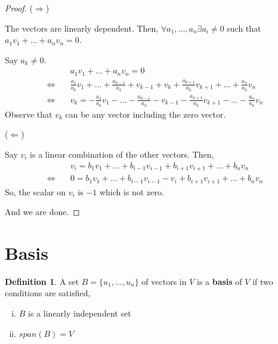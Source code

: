 \documentclass{report}
\theoremstyle{definition}
\newtheorem*{_def}{Definition}
\theoremstyle{remark}
\begin{document}
\begin{proof}
($\Rightarrow$)

The vectors are linearly dependent.
Then, $\forall a_1,...,a_n \exists a_i\neq 0$ such that $a_1v_1+...+a_nv_n=0$.

Say $a_k\neq 0$.
\begin{align*}
& a_1v_1+...+a_nv_n=0 \\
\Leftrightarrow \quad &\frac{a_1}{a_k}v_1+...+\frac{a_{k-1}}{a_k}+v_{k-1}+v_k+\frac{a_{k+1}}{a_k}v_{k+1}+...+\frac{a_n}{a_k}v_n \\
\Leftrightarrow \quad &v_k=-\frac{a_1}{a_k}v_1-...-\frac{a_{k-1}}{a_k}-v_{k-1}-\frac{a_{k+1}}{a_k}v_{k+1}-...-\frac{a_n}{a_k}v_n
\end{align*}
Observe that $v_k$ can be any vector including the zero vector.

($\Leftarrow$)

Say $v_i$ is a linear combination of the other vectors.
Then,
\begin{align*}
& v_i=b_1v_1+...+b_{i-1}v_{i-1}+b_{i+1}v_{i+1}+...+b_nv_n \\
\Leftrightarrow \quad & 0=b_1v_1+...+b_{i-1}v_{i-1}-v_i+b_{i+1}v_{i+1}+...+b_nv_n
\end{align*}
So, the scalar on $v_i$ is $-1$ which is not zero.

And we are done.
\end{proof}

\section{Basis}

\begin{_def}
A set $B=\{u_1,...,u_n\}$ of vectors in $V$ is a \textbf{basis} of $V$ if two conditions are satisfied,
\begin{enumerate}[i)]
 \item $B$ is a linearly independent set
 \item $span(B)=V$
\end{enumerate}
\end{_def}
\end{document}
